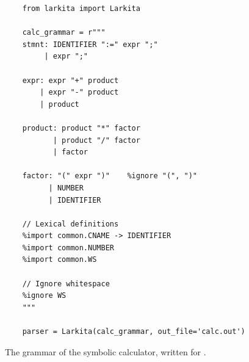 \begin{figure}[!ht]
\centering
\begin{verbatim}
    from larkita import Larkita

    calc_grammar = r"""
    stmnt: IDENTIFIER ":=" expr ";"
         | expr ";"

    expr: expr "+" product
        | expr "-" product
        | product

    product: product "*" factor
           | product "/" factor
           | factor

    factor: "(" expr ")"    %ignore "(", ")"
          | NUMBER
          | IDENTIFIER

    // Lexical definitions
    %import common.CNAME -> IDENTIFIER
    %import common.NUMBER
    %import common.WS

    // Ignore whitespace
    %ignore WS
    """

    parser = Larkita(calc_grammar, out_file='calc.out')
\end{verbatim}
\vspace*{-0.3cm}
\caption{The grammar of the symbolic calculator, written for .}
\label{fig:01-Calculator.ipynb:grammar}
\end{figure}

